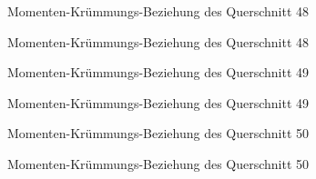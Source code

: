 \documentclass[
  11pt,
  letterpaper,
]{scrreprt}
\begin{document}
\begin{figure}[H]


\caption{\label{fig-qs_48}Momenten-Krümmungs-Beziehung des Querschnitt
48}

\end{figure}%

\begin{figure}[H]


\caption{\label{fig-m_chi_48}Momenten-Krümmungs-Beziehung des
Querschnitt 48}

\end{figure}%

\begin{figure}[H]


\caption{\label{fig-qs_49}Momenten-Krümmungs-Beziehung des Querschnitt
49}

\end{figure}%

\begin{figure}[H]


\caption{\label{fig-m_chi_49}Momenten-Krümmungs-Beziehung des
Querschnitt 49}

\end{figure}%

\begin{figure}[H]


\caption{\label{fig-qs_50}Momenten-Krümmungs-Beziehung des Querschnitt
50}

\end{figure}%

\begin{figure}[H]


\caption{\label{fig-m_chi_50}Momenten-Krümmungs-Beziehung des
Querschnitt 50}

\end{figure}%
\end{document}

